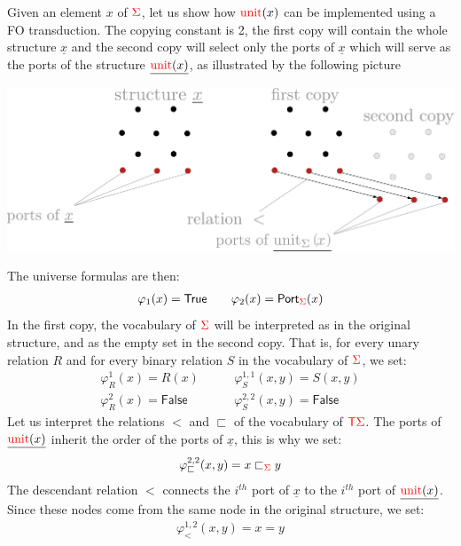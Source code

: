     
   Given an element $x$ of ${\color{red}{\Sigma}}$, let us show how  ${\color{red}{\mathrm{unit}}}(x)$ can be implemented using a FO transduction.  The copying constant is 2,
    the first copy will contain the whole structure $\underline{x}$ and the second copy will select only the ports of $\underline{x}$ which will serve as the ports of the structure $\underline{{\color{red}{\mathrm{unit}}}(x)}$, as illustrated by the following picture 
\begin{center}
    \includegraphics[scale=.18]{pictures/to-logic-unit.pdf}
    \end{center}    
      The universe formulas are then:
    \begin{align*}
    \varphi_1(x)=\mathsf{True} \qquad \varphi_2(x)=\mathsf{Port}_{\color{red}{\Sigma}}(x)
    \end{align*}
    In the first copy, the vocabulary of ${\color{red}{\Sigma}}$ will be interpreted as in the original structure, and as the empty set in the second copy. That is, for every unary relation $R$ and for every binary relation $S$ in the vocabulary of  ${\color{red}{\Sigma}}$, we set:
    \begin{align*}
   \varphi_R^{1}(x)=R(x) \quad&\quad \varphi_S^{1,1}(x,y)=S(x,y)\\
   \varphi_R^{2}(x)=\mathsf{False} \quad&\quad \varphi_S^{2,2}(x,y)=\mathsf{False}
\end{align*}      
Let us interpret the relations $<$ and $\sqsubset$ of the vocabulary of ${\color{red}{\mathsf T}}{\color{red}{\Sigma}}$. The  ports of $\underline{{\color{red}{\mathrm{unit}}}(x)}$ inherit the order of the ports of $\underline{x}$, this is why we set:
\begin{align*}
\varphi_\sqsubset^{2,2}(x,y)=x\sqsubset_{\color{red}{\Sigma}} y
\end{align*}
The descendant relation $<$ connects the $i^{th}$ port of $\underline{x}$ to the $i^{th}$ port of $\underline{{\color{red}{\mathrm{unit}}}(x)}$. Since these nodes come from the same node in the original structure, we set:
\begin{align*}
\varphi_<^{1,2}(x,y)=x=y
\end{align*}